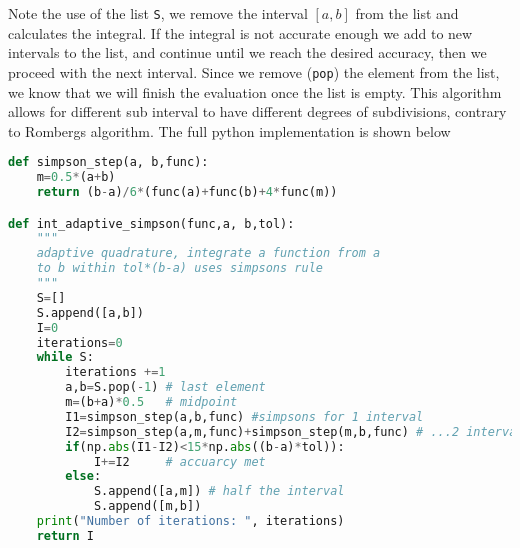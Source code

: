 \documentclass[graybox,sectrefs,envcountresetchap,open=right,final]{svmonodo}
\begin{document}
\noindent
Note the use of the list \texttt{S}, we remove the interval $[a,b]$ from the list and calculates the integral. If the integral is not accurate enough we add to new intervals to the list, and continue until we reach the desired accuracy, then we proceed with the next interval. Since we remove (\texttt{pop}) the element from the list, we know that we will finish the evaluation once the list is empty. This algorithm allows for different sub interval to have different degrees of subdivisions, contrary to Rombergs algorithm. The full python implementation is shown below



























\begin{lstlisting}[language=python,style=blue1]
def simpson_step(a, b,func):
    m=0.5*(a+b)
    return (b-a)/6*(func(a)+func(b)+4*func(m))

def int_adaptive_simpson(func,a, b,tol):
    """
    adaptive quadrature, integrate a function from a
    to b within tol*(b-a) uses simpsons rule
    """
    S=[]
    S.append([a,b])
    I=0
    iterations=0
    while S:
        iterations +=1
        a,b=S.pop(-1) # last element
        m=(b+a)*0.5   # midpoint
        I1=simpson_step(a,b,func) #simpsons for 1 interval 
        I2=simpson_step(a,m,func)+simpson_step(m,b,func) # ...2 intervals
        if(np.abs(I1-I2)<15*np.abs((b-a)*tol)):
            I+=I2     # accuarcy met
        else:
            S.append([a,m]) # half the interval 
            S.append([m,b])
    print("Number of iterations: ", iterations)
    return I

\end{lstlisting}
\end{document}
